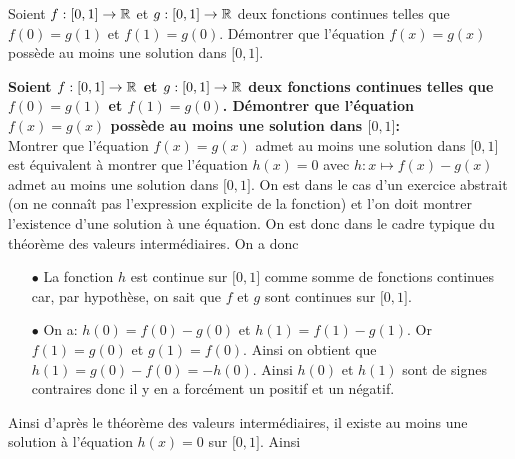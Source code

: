 \documentclass[a4paper, 11pt,reqno]{article}
\begin{document}
\begin{exercice}  \;
	Soient $f: \lbrack 0,1\rbrack\rightarrow \mathbb{R}$ et $g: \lbrack 0,1\rbrack\rightarrow \mathbb{R}$ deux fonctions continues telles que $f(0)=g(1)$ et $f(1)=g(0)$. D\'emontrer que l'\'equation $f(x)=g(x)$ poss\`{e}de au moins une solution dans $\lbrack 0,1\rbrack$.
\end{exercice}
\begin{correction}  \;
	\textbf{Soient $f: \lbrack 0,1\rbrack\rightarrow \mathbb{R}$ et $g: \lbrack 0,1\rbrack\rightarrow \mathbb{R}$ deux fonctions continues telles que $f(0)=g(1)$ et $f(1)=g(0)$. D\'emontrer que l'\'equation $f(x)=g(x)$ poss\`{e}de au moins une solution dans $\lbrack 0,1\rbrack$:}\\
	\noindent Montrer que l'\'equation $f(x)=g(x)$ admet au moins une solution dans $\lbrack 0,1\rbrack$ est \'equivalent \`{a} montrer que l'\'equation $h(x)=0$ avec $h: x\mapsto f(x)-g(x)$ admet au moins une solution dans $\lbrack 0,1\rbrack$. On est dans le cas d'un exercice abstrait (on ne conna\^{i}t pas l'expression explicite de la fonction) et l'on doit montrer l'existence d'une solution \`{a} une \'equation. On est donc dans le cadre typique du th\'eor\`{e}me des valeurs interm\'ediaires. On a donc
	\begin{itemize}
		\item[$\bullet$] La fonction $h$ est continue sur $\lbrack 0,1\rbrack$ comme somme de fonctions continues car, par hypoth\`{e}se, on sait que $f$ et $g$ sont continues sur $\lbrack 0,1\rbrack$.
		\item[$\bullet$] On a: $h(0)=f(0)-g(0)$ et $h(1)=f(1)-g(1)$. Or $f(1)=g(0)$ et $g(1)=f(0)$. Ainsi on obtient que $h(1)=g(0)-f(0)=-h(0)$. Ainsi $h(0)$ et $h(1)$ sont de signes contraires donc il y en a forc\'ement un positif et un n\'egatif.
	\end{itemize}
	Ainsi d'apr\`{e}s le th\'eor\`{e}me des valeurs interm\'ediaires, il existe au moins une solution \`{a} l'\'equation $h(x)=0$ sur $\lbrack 0,1\rbrack$. Ainsi 
\end{correction}
\end{document}
